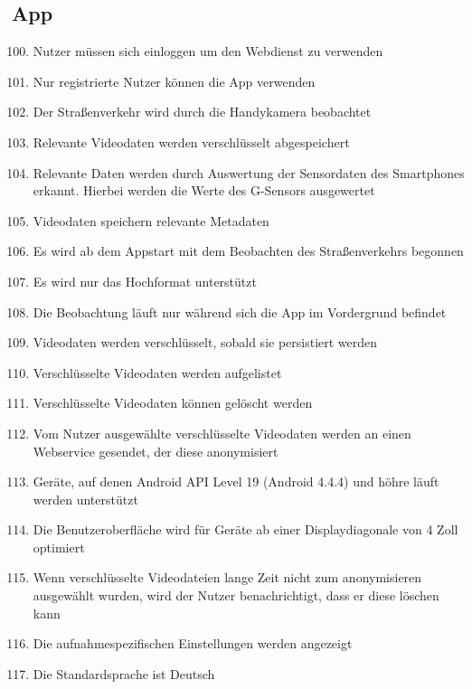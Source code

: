 \subsection{App}
	\begin{enumerate}[\bfseries{PK}10]
	\setcounter{enumi}{99}
	\item Nutzer müssen sich einloggen um den Webdienst zu verwenden
	\item Nur registrierte Nutzer können die App verwenden
	\item Der Straßenverkehr wird durch die Handykamera beobachtet 
	\item Relevante Videodaten werden verschlüsselt abgespeichert
	\item Relevante Daten werden durch Auswertung der Sensordaten des Smartphones erkannt. Hierbei werden die Werte des G-Sensors ausgewertet
	\item Videodaten speichern relevante Metadaten
	\item Es wird ab dem Appstart mit dem Beobachten des Straßenverkehrs begonnen
	\item Es wird nur das Hochformat unterstützt
	\item Die Beobachtung läuft nur während sich die App im Vordergrund befindet
	\item Videodaten werden verschlüsselt, sobald sie persistiert werden
	\item Verschlüsselte Videodaten werden aufgelistet
	\item Verschlüsselte Videodaten können gelöscht werden
	\item Vom Nutzer ausgewählte verschlüsselte Videodaten werden an einen Webservice gesendet, der diese anonymisiert
	\item Geräte, auf denen Android API Level 19 (Android 4.4.4) und höhre läuft werden unterstützt
	\item Die Benutzeroberfläche wird für Geräte ab einer Displaydiagonale von 4 Zoll optimiert
	\item Wenn verschlüsselte Videodateien lange Zeit nicht zum anonymisieren ausgewählt wurden, wird der Nutzer benachrichtigt, dass er diese löschen kann
	\item Die aufnahmespezifischen Einstellungen werden angezeigt
	\item Die Standardsprache ist Deutsch
	\end{enumerate}

